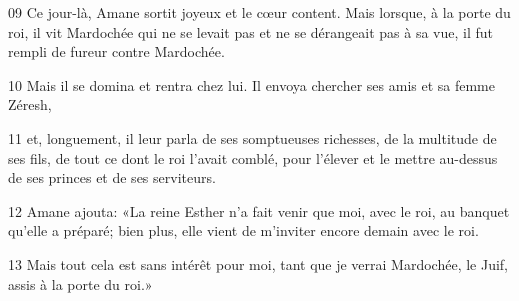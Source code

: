 
09 Ce jour-là, Amane sortit joyeux et le cœur content. Mais lorsque, à la porte du roi, il vit Mardochée qui ne se levait pas et ne se dérangeait pas à sa vue, il fut rempli de fureur contre Mardochée.

10 Mais il se domina et rentra chez lui. Il envoya chercher ses amis et sa femme Zéresh,

11 et, longuement, il leur parla de ses somptueuses richesses, de la multitude de ses fils, de tout ce dont le roi l’avait comblé, pour l’élever et le mettre au-dessus de ses princes et de ses serviteurs.

12 Amane ajouta: «La reine Esther n’a fait venir que moi, avec le roi, au banquet qu’elle a préparé; bien plus, elle vient de m’inviter encore demain avec le roi.

13 Mais tout cela est sans intérêt pour moi, tant que je verrai Mardochée, le Juif, assis à la porte du roi.»
